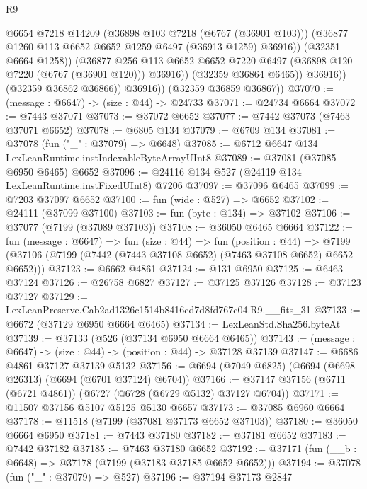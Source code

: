 \begin{lexlean}{R9}
\begin{coremodule}
                        @6654
                        @7218
                        @14209
                        (@36898 @103 @7218 (@6767 (@36901 @103)))
                        (@36877 @1260 @113 @6652 @6652 @1259 @6497 (@36913 @1259) @36916))
                      (@32351 @6664 @1258))
                    (@36877
                      @256
                      @113
                      @6652
                      @6652
                      @7220
                      @6497
                      (@36898 @120 @7220 (@6767 (@36901 @120)))
                      @36916))
                  (@32359 @36864 @6465))
                @36916))
            (@32359 @36862 @36866))
          @36916))
      (@32359 @36859 @36867))
@37070 := (message : @6647) -> (size : @44) -> @24733
@37071 := @24734 @6664
@37072 := @7443 @37071
@37073 := @37072 @6652
@37077 := @7442 @37073 (@7463 @37071 @6652)
@37078 := @6805 @134
@37079 := @6709 @134
@37081 := @37078 (fun ("_" : @37079) => @6648)
@37085 := @6712 @6647 @134 LexLeanRuntime.instIndexableByteArrayUInt8
@37089 := @37081 (@37085 @6950 @6465) @6652
@37096 := @24116 @134 @527 (@24119 @134 LexLeanRuntime.instFixedUInt8) @7206
@37097 := @37096 @6465
@37099 := @7203 @37097 @6652
@37100 := fun (wide : @527) => @6652
@37102 := @24111 (@37099 @37100)
@37103 := fun (byte : @134) => @37102
@37106 := @37077 (@7199 (@37089 @37103))
@37108 := @36050 @6465 @6664
@37122 := fun (message : @6647) =>
  fun (size : @44) =>
  fun (position : @44) =>
  @7199 (@37106 (@7199 (@7442 (@7443 @37108 @6652) (@7463 @37108 @6652) @6652 @6652)))
@37123 := @6662 @4861
@37124 := @131 @6950
@37125 := @6463 @37124
@37126 := @26758 @6827
@37127 := @37125 @37126
@37128 := @37123 @37127
@37129 := LexLeanPreserve.Cab2ad1326c1514b8416cd7d8fd767c04.R9.__fits_31
@37133 := @6672 (@37129 @6950 @6664 @6465)
@37134 := LexLeanStd.Sha256.byteAt
@37139 := @37133 (@526 (@37134 @6950 @6664 @6465))
@37143 := (message : @6647) -> (size : @44) -> (position : @44) -> @37128 @37139
@37147 := @6686 @4861 @37127 @37139 @5132
@37156 := @6694 (@7049 @6825) (@6694 (@6698 @26313) (@6694 (@6701 @37124) @6704))
@37166 := @37147 @37156 (@6711 (@6721 @4861)) (@6727 (@6728 (@6729 @5132) @37127 @6704))
@37171 := @11507 @37156 @5107 @5125 @5130 @6657
@37173 := @37085 @6960 @6664
@37178 := @11518 (@7199 (@37081 @37173 @6652 @37103))
@37180 := @36050 @6664 @6950
@37181 := @7443 @37180
@37182 := @37181 @6652
@37183 := @7442 @37182
@37185 := @7463 @37180 @6652
@37192 := @37171 (fun (__b : @6648) => @37178 (@7199 (@37183 @37185 @6652 @6652)))
@37194 := @37078 (fun ("_" : @37079) => @527)
@37196 := @37194 @37173 @2847

\end{coremodule}
\end{lexlean}
